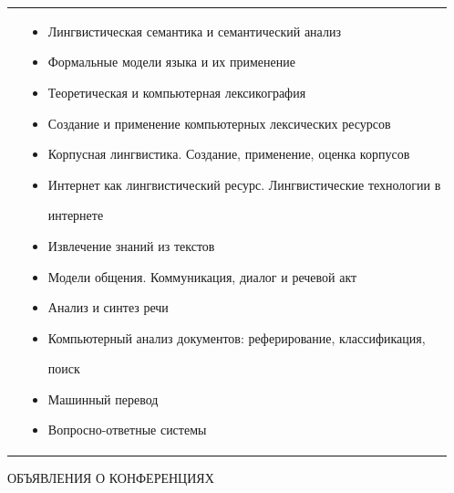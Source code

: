 \documentclass[10pt]{book}
\begin{document}
\begin{tabular}{p{7mm}p{420pt}}


\hspace*{7mm}&


\begin{itemize}


\item Лингвистическая семантика и семантический анализ


\item Формальные модели языка и их применение


\item Теоретическая и компьютерная лексикография


\item Создание и применение компьютерных лексических ресурсов


\item Корпусная лингвистика. Создание, применение, оценка корпусов


\item Интернет как лингвистический ресурс. Лингвистические технологии в


интернете


\item Извлечение знаний из текстов


\item Модели общения. Коммуникация, диалог и речевой акт


\item Анализ и синтез речи


\item Компьютерный анализ документов: реферирование, классификация,


поиск


\item Машинный перевод


\item Вопросно-ответные системы


\end{itemize}


\end{tabular}










\newpage





\begin{center}





{\prgsh\LARGE


ОБЪЯВЛЕНИЯ О КОНФЕРЕНЦИЯХ}





\end{center}
\end{document}
